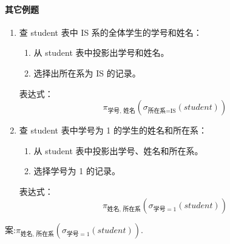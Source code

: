\paragraph{其它例题}
\begin{enumerate}
    \item 查 student 表中 IS 系的全体学生的学号和姓名：
    \begin{enumerate}
        \item 从 student 表中投影出学号和姓名。
        \item 选择出所在系为 IS 的记录。
    \end{enumerate}
    表达式：
    \[
    \pi_{\text{学号, 姓名}}(\sigma_{\text{所在系} = \text{IS}}(student))
    \]
    
    \item 查 student 表中学号为 1 的学生的姓名和所在系：
    \begin{enumerate}
        \item 从 student 表中投影出学号、姓名和所在系。
        \item 选择学号为 1 的记录。
    \end{enumerate}
    表达式：
    \[
    \pi_{\text{姓名, 所在系}}(\sigma_{\text{学号} = 1}(student))
    \]
\end{enumerate}案:$\pi_{\text{姓名, 所在系}}(\sigma_{\text{学号} = 1}(student))$.